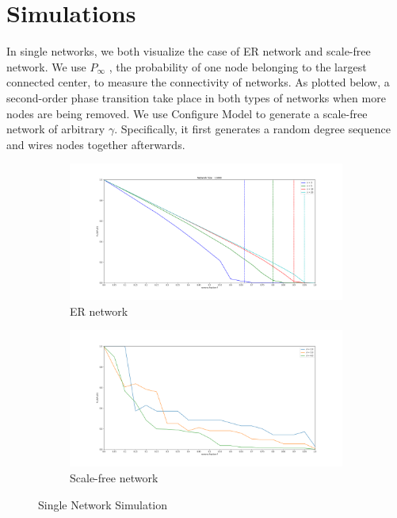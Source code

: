 \documentclass[11pt]{article}
\begin{document}
 \section{Simulations}
 In single networks, we both visualize the case of ER network and scale-free network. We use $P_\infty$ , the probability of one node belonging to the largest connected center, to measure the connectivity of networks. As plotted below, a second-order phase transition take place in both types of networks when more nodes are being removed. We use Configure Model to generate a scale-free network of arbitrary $\gamma$. Specifically, it first generates a random degree sequence and wires nodes together afterwards.

 \begin{figure}
    \centering
    \begin{subfigure}[b]{0.45\textwidth}
        \includegraphics[width=\textwidth]{ser.png}
        \caption{ER network}
        \label{fig:er}
    \end{subfigure}
    \quad
    \begin{subfigure}[b]{0.45\textwidth}
        \includegraphics[width=\textwidth]{sba.png}
        \caption{Scale-free network}
        \label{fig:ba}
    \end{subfigure}
    \caption{Single Network Simulation}\label{fig:networks}
\end{figure}
 
 
\newpage

\end{document}
